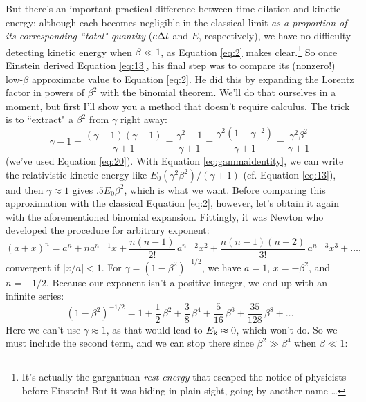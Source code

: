 \documentclass[12pt]{article}
\begin{document}
But there's an important practical difference between time dilation and kinetic energy: although each becomes negligible in the classical limit \emph{as a proportion of its corresponding ``total" quantity} ($c \mkern.5mu \Delta t$ and $E$, respectively), we have no difficulty detecting kinetic energy when $\beta \ll 1$, as Equation \ref{eq:2} makes clear.\footnote{It's actually the gargantuan \emph{rest energy} that escaped the notice of physicists before Einstein! But it was hiding in plain sight, going by another name \dots} So once Einstein derived Equation \ref{eq:13}, his final step was to compare its (nonzero!) low-$\beta$ approximate value to Equation \ref{eq:2}. He did this by expanding the Lorentz factor in powers of $\beta^2$ with the binomial theorem. We'll do that ourselves in a moment, but first I'll show you a method that doesn't require calculus. The trick is to ``extract" a $\beta^2$ from $\gamma$ right away:
\begin{equation}\label{eq:gammaidentity}
\gamma - 1 = \frac{(\gamma - 1)(\gamma + 1)}{\gamma + 1} = \frac{\gamma^2 - 1}{\gamma + 1} = \frac{\gamma^2 (1 - \gamma^{-2})}{\gamma + 1} = \frac{\gamma^2 \beta^2}{\gamma + 1}
\end{equation}
(we've used Equation \ref{eq:20}). With Equation \ref{eq:gammaidentity}, we can write the relativistic kinetic energy like $E_0 (\gamma^2 \beta^2)/(\gamma + 1)$ (cf. Equation \ref{eq:13}), and then $\gamma \approx 1$ gives $.5 E_0 \beta^2$, which is what we want. Before comparing this approximation with the classical Equation \ref{eq:2}, however, let's obtain it again with the aforementioned binomial expansion. Fittingly, it was Newton who developed the procedure for arbitrary exponent:
\begin{equation*}
(a+x)^n = a^n + na^{n-1}x + \frac{n(n-1)}{2!} \, a^{n-2}x^2 + \frac{n(n-1)(n-2)}{3!} \, a^{n-3}x^3 + \dots ,
\end{equation*}
convergent if $|x/a| < 1$. For $\gamma = (1-\beta^2)^{-1/2}$, we have $a=1$, $x=-\beta^2$, and $n=-1/2$. Because our exponent isn't a positive integer, we end up with an infinite series:
\begin{equation*}
\left(1-\beta^2\right)^{-1/2}=1 + \dfrac{1}{2}\,\beta^2 +  \frac {3}{8} \, \beta^4 + \frac{5}{16} \, \beta^6 + \frac{35}{128} \, \beta^8 + \dots
\end{equation*}
Here we can't use $\gamma \approx 1$, as that would lead to $E_{\mkern.5mu \textrm{k}} \approx 0$, which won't do. So we must include the second term, and we can stop there since $\beta^2 \gg \beta^4$ when $\beta \ll 1$:
\end{document}
